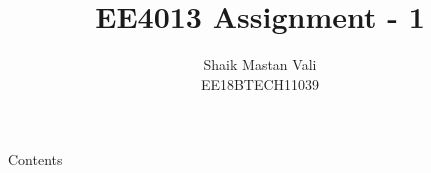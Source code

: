 \documentclass{beamer}
\author{Shaik Mastan Vali \\ EE18BTECH11039}
\title{EE4013 Assignment - 1}
\institute[]{IIT Hyderabad}
\begin{document}
\maketitle
\begin{frame}{Contents}
    \tableofcontents
\end{frame}



\end{document}
